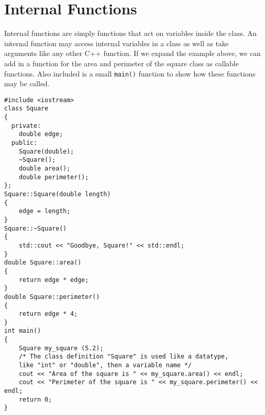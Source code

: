 \section{Internal Functions}
Internal functions are simply functions that act on variables inside the class.  An internal function may access internal variables in a class as well as take arguments like any other C++ function.  If we expand the example above, we can add in a function for the area and perimeter of the square class as callable functions.  Also included is a small \texttt{main()} function to show how these functions may be called.

\begin{verbatim}
#include <iostream>
class Square
{
  private:
    double edge;
  public:
    Square(double); 
    ~Square();
    double area();
    double perimeter();
};
Square::Square(double length)
{
    edge = length;
}
Square::~Square()
{
    std::cout << "Goodbye, Square!" << std::endl;
}
double Square::area()
{
    return edge * edge;
}
double Square::perimeter()
{
    return edge * 4;
}
int main()
{
    Square my_square (5.2); 
    /* The class definition "Square" is used like a datatype, 
    like "int" or "double", then a variable name */
    cout << "Area of the square is " << my_square.area() << endl;
    cout << "Perimeter of the square is " << my_square.perimeter() << endl;
    return 0;
}
\end{verbatim}
